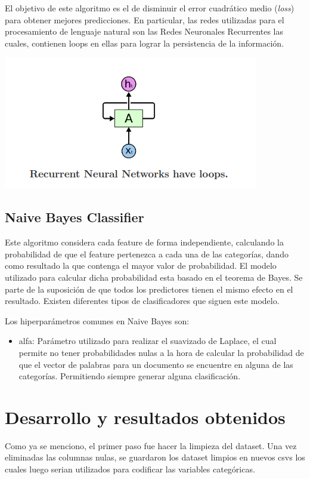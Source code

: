 \documentclass[12pt,a4paper]{article}
\begin{document}
El objetivo de este algoritmo es el de disminuir el error cuadrático medio (\textit{loss}) para obtener mejores predicciones.
En particular, las redes utilizadas para el procesamiento de lenguaje natural son las Redes Neuronales Recurrentes las cuales, contienen loops en ellas para lograr la persistencia de la información. 

\begin{center}
    \includegraphics[scale=0.5]{imgs/red neuronal recurrente.png}
\end{center}

\subsection{Naive Bayes Classifier}
Este algoritmo considera cada feature de forma independiente, calculando la probabilidad de que el feature pertenezca a cada una de las categorías, dando como resultado la que contenga el mayor valor de probabilidad. El modelo utilizado para calcular dicha probabilidad esta basado en el teorema de Bayes. Se parte de la suposición de que todos los predictores tienen el mismo efecto en el resultado. Existen diferentes tipos de clasificadores que siguen este modelo.

Los hiperparámetros comunes en Naive Bayes son:
\begin{itemize}
    \item alfa: Parámetro utilizado para realizar el suavizado de Laplace, el cual permite no tener probabilidades nulas a la hora de calcular la probabilidad de que el vector de palabras para un documento se encuentre en alguna de las categorías. Permitiendo siempre generar alguna clasificación. 
\end{itemize}

\section{Desarrollo y resultados obtenidos}
Como ya se menciono, el primer paso fue hacer la limpieza del dataset. Una vez eliminadas las columnas nulas, se guardaron los dataset limpios en nuevos csvs los cuales luego serian utilizados para codificar las variables categóricas. \newline
\end{document}
